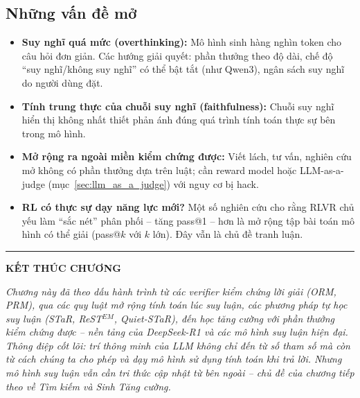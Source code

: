 \subsection{Những vấn đề mở}
\label{ssec:reasoning_open_problems}
\begin{itemize}
	\item \textbf{Suy nghĩ quá mức (overthinking):} Mô hình sinh hàng nghìn token cho câu hỏi đơn giản. Các hướng giải quyết: phần thưởng theo độ dài, chế độ “suy nghĩ/không suy nghĩ” có thể bật tắt (như Qwen3), ngân sách suy nghĩ do người dùng đặt.
	\item \textbf{Tính trung thực của chuỗi suy nghĩ (faithfulness):} Chuỗi suy nghĩ hiển thị không nhất thiết phản ánh đúng quá trình tính toán thực sự bên trong mô hình.
	\item \textbf{Mở rộng ra ngoài miền kiểm chứng được:} Viết lách, tư vấn, nghiên cứu mở không có phần thưởng dựa trên luật; cần reward model hoặc LLM-as-a-judge (mục~\ref{sec:llm_as_a_judge}) với nguy cơ bị hack.
	\item \textbf{RL có thực sự dạy năng lực mới?} Một số nghiên cứu cho rằng RLVR chủ yếu làm “sắc nét” phân phối -- tăng pass@1 -- hơn là mở rộng tập bài toán mô hình có thể giải (pass@$k$ với $k$ lớn). Đây vẫn là chủ đề tranh luận.
\end{itemize}

\bigskip
\hrule
\bigskip

\begin{center}
    \textbf{\Large KẾT THÚC CHƯƠNG \thechapter}
\end{center}

\textit{Chương này đã theo dấu hành trình từ các verifier kiểm chứng lời giải (ORM, PRM), qua các quy luật mở rộng tính toán lúc suy luận, các phương pháp tự học suy luận (STaR, ReST$^{EM}$, Quiet-STaR), đến học tăng cường với phần thưởng kiểm chứng được -- nền tảng của DeepSeek-R1 và các mô hình suy luận hiện đại. Thông điệp cốt lõi: trí thông minh của LLM không chỉ đến từ số tham số mà còn từ cách chúng ta cho phép và dạy mô hình sử dụng tính toán khi trả lời. Nhưng mô hình suy luận vẫn cần tri thức cập nhật từ bên ngoài -- chủ đề của chương tiếp theo về Tìm kiếm và Sinh Tăng cường.}
